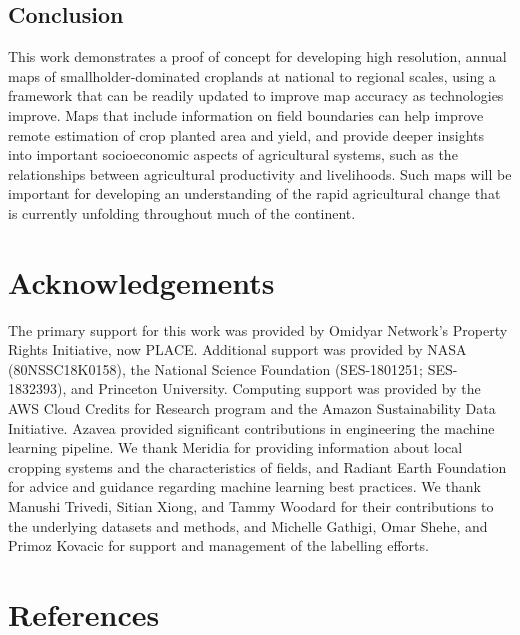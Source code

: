 \documentclass[11pt,a4paper]{article}
\begin{document}
\hypertarget{conclusion}{%
\subsection{Conclusion}\label{conclusion}}

This work demonstrates a proof of concept for developing high
resolution, annual maps of smallholder-dominated croplands at national
to regional scales, using a framework that can be readily updated to
improve map accuracy as technologies improve. Maps that include
information on field boundaries can help improve remote estimation of
crop planted area and yield, and provide deeper insights into important
socioeconomic aspects of agricultural systems, such as the relationships
between agricultural productivity and livelihoods. Such maps will be
important for developing an understanding of the rapid agricultural
change that is currently unfolding throughout much of the continent.

\hypertarget{acknowledgements}{%
\section{Acknowledgements}\label{acknowledgements}}

The primary support for this work was provided by Omidyar Network's
Property Rights Initiative, now PLACE. Additional support was provided
by NASA (80NSSC18K0158), the National Science Foundation (SES-1801251;
SES-1832393), and Princeton University. Computing support was provided
by the AWS Cloud Credits for Research program and the Amazon
Sustainability Data Initiative. Azavea provided significant
contributions in engineering the machine learning pipeline. We thank
Meridia for providing information about local cropping systems and the
characteristics of fields, and Radiant Earth Foundation for advice and
guidance regarding machine learning best practices. We thank Manushi
Trivedi, Sitian Xiong, and Tammy Woodard for their contributions to the
underlying datasets and methods, and Michelle Gathigi, Omar Shehe, and
Primoz Kovacic for support and management of the labelling efforts.

\hypertarget{references}{%
\section{References}\label{references}}

\singlespace
\end{document}
